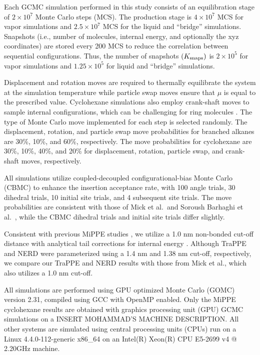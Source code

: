 \documentclass[journal=jced,manuscript=article]{achemso}
\begin{document}
Each GCMC simulation performed in this study consists of an equilibration stage of $2 \times 10^7$ Monte Carlo steps (MCS). The production stage is $4 \times 10^7$ MCS for vapor simulations and $2.5 \times 10^7$ MCS for the liquid and ``bridge'' simulations. Snapshots (i.e., number of molecules, internal energy, and optionally the xyz coordinates) are stored every 200 MCS to reduce the correlation between sequential configurations. Thus, the number of snapshots $(K_{\rm snaps})$ is $2 \times 10^5$ for vapor simulations and $1.25 \times 10^5$ for liquid and ``bridge'' simulations. 

Displacement and rotation moves are required to thermally equilibrate the system at the simulation temperature while particle swap moves ensure that $\mu$ is equal to the prescribed value. Cyclohexane simulations also employ crank-shaft moves to sample internal configurations, which can be challenging for ring molecules \cite{Shah2011,Binder1979}. The type of Monte Carlo move implemented for each step is selected randomly. The displacement, rotation, and particle swap move probabilities for branched alkanes are 30\%, 10\%, and 60\%, respectively. The move probabilities for cyclohexane are 30\%, 10\%, 40\%, and 20\% for displacement, rotation, particle swap, and crank-shaft moves, respectively. 

All simulations utilize coupled-decoupled configurational-bias Monte Carlo (CBMC)\cite{Martin1999} to enhance the insertion acceptance rate, with 100 angle trials, 30 dihedral trials, 10 initial site trials, and 4 subsequent site trials. The move probabilities are consistent with those of Mick et al.~and Soroush Barhaghi et al.~\cite{Potoff_branched,Barhaghi2017}, while the CBMC dihedral trials and initial site trials differ slightly.

Consistent with previous MiPPE studies \cite{Mie,Potoff_branched,Barhaghi2017}, we utilize a 1.0 nm non-bonded cut-off distance with analytical tail corrections for internal energy \cite{Allen2017}. Although TraPPE \cite{TraPPE,Martin1999,Keasler2012} and NERD \cite{NERD,Nath2001} were parameterized using a 1.4 nm and 1.38 nm cut-off, respectively, we compare our TraPPE and NERD results with those from Mick et al., which also utilizes a 1.0 nm cut-off.

All simulations are performed using GPU optimized Monte Carlo (GOMC) \cite{Nejahi2018} version 2.31, compiled using GCC with OpenMP enabled. Only the MiPPE cyclohexane results are obtained with graphics processing unit (GPU) GCMC simulations on a INSERT MOHAMMAD'S MACHINE DESCRIPTION. All other systems are simulated using central processing units (CPUs) run on a Linux 4.4.0-112-generic x86\_64 on an Intel(R) Xeon(R) CPU E5-2699 v4 @ 2.20GHz machine. 
\end{document}
